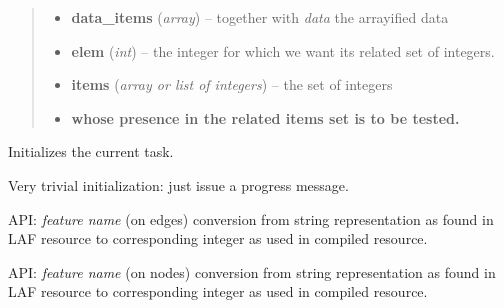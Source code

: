\documentclass[letterpaper,10pt,english]{sphinxmanual}
\begin{document}
\begin{fulllineitems}
\begin{fulllineitems}
\begin{quote}
\begin{description}
\begin{itemize}
\item {} 
\textbf{data\_items} (\emph{array}) --
together with \emph{data} the arrayified data

\item {} 
\textbf{elem} (\emph{int}) --
the integer for which we want its related set of integers.

\item {} 
\textbf{items} (\emph{array or list of integers}) --
the set of integers

\item {} 
\textbf{whose presence in the related items set is to be tested.}

\end{itemize}

\end{description}\end{quote}

\end{fulllineitems}


\begin{fulllineitems}
\label{graf/graf:graf.task.GrafTask.init_task}
Initializes the current task.

Very trivial initialization: just issue a progress message.

\end{fulllineitems}


\begin{fulllineitems}
\label{graf/graf:graf.task.GrafTask.int_fname_edge}
API: \emph{feature name} (on edges) conversion from string representation as found in LAF resource
to corresponding integer as used in compiled resource.

\end{fulllineitems}


\begin{fulllineitems}
\label{graf/graf:graf.task.GrafTask.int_fname_node}
API: \emph{feature name} (on nodes) conversion from string representation as found in LAF resource
to corresponding integer as used in compiled resource.

\end{fulllineitems}


\end{fulllineitems}
\end{document}
